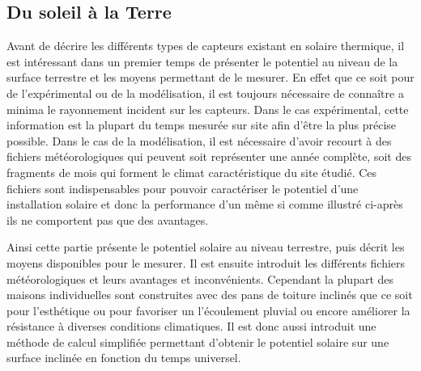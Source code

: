 \subsection{Du soleil à la Terre} %
\label{sub:du_soleil_a_la_terre}
Avant de décrire les différents types de capteurs existant en solaire thermique,
il est intéressant dans un premier temps de présenter le potentiel au niveau de
la surface terrestre et les moyens permettant de le mesurer. En effet que ce soit
pour de l’expérimental ou de la modélisation, il est toujours nécessaire de connaître
a minima le rayonnement incident sur les capteurs. Dans le cas expérimental, cette
information est la plupart du temps mesurée sur site afin d’être la plus précise
possible. Dans le cas de la modélisation, il est nécessaire d’avoir recourt à des
fichiers météorologiques qui peuvent soit représenter une année complète, soit des
fragments de mois qui forment le climat caractéristique du site étudié. Ces fichiers
sont indispensables pour pouvoir caractériser le potentiel d’une installation solaire
et donc la performance d’un  même si comme illustré ci-après ils ne comportent
pas que des avantages.

Ainsi cette partie présente le potentiel solaire au niveau terrestre, puis décrit les
moyens disponibles pour le mesurer. Il est ensuite introduit les différents fichiers
météorologiques et leurs avantages et inconvénients. Cependant la plupart des maisons
individuelles sont construites avec des pans de toiture inclinés que ce soit pour
l’esthétique ou pour favoriser un l’écoulement pluvial ou encore améliorer la résistance à
diverses conditions climatiques. Il est donc aussi introduit une méthode de calcul
simplifiée permettant d’obtenir le potentiel solaire sur une surface inclinée en fonction
du temps universel.


